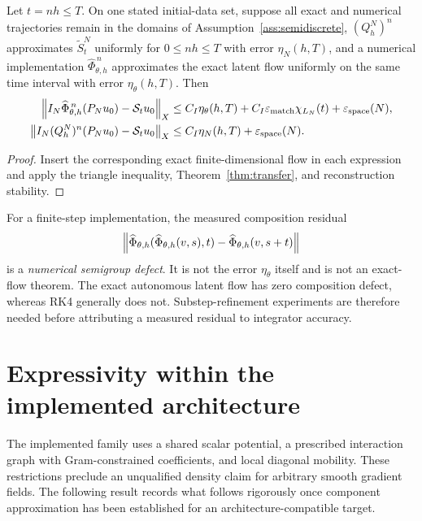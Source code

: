 \begin{proposition}\label{prop:numerical-transfer}
Let $t=nh\le T$. On one stated initial-data set, suppose all exact and numerical trajectories remain in the domains of Assumption~\ref{ass:semidiscrete}, $(Q_h^N)^n$ approximates $\widetilde S_t^N$ uniformly for $0\leq nh\leq T$ with error $\eta_N(h,T)$, and a numerical implementation $\widehat\Phi_{\theta,h}^{\,n}$ approximates the exact latent flow uniformly on the same time interval with error $\eta_\theta(h,T)$. Then
\begin{align}\label{eq:numerical-transfer}
\left\lVert I_N\widehat\Phi_{\theta,h}^{\,n}(P_Nu_0)-\mathcal{S}_tu_0 \right\rVert_X
&\le C_I\eta_\theta(h,T)
+C_I\varepsilon_{\mathrm{match}}\chi_{L_N}(t)
+\varepsilon_{\mathrm{space}}(N),\\
\left\lVert I_N(Q_h^N)^n(P_Nu_0)-\mathcal{S}_tu_0 \right\rVert_X
&\le C_I\eta_N(h,T)+\varepsilon_{\mathrm{space}}(N).
\end{align}
\end{proposition}

\begin{proof}
Insert the corresponding exact finite-dimensional flow in each expression and apply the triangle inequality, Theorem~\ref{thm:transfer}, and reconstruction stability.
\end{proof}

\begin{remark}\label{rem:numerical-semigroup-defect}
For a finite-step implementation, the measured composition residual
\begin{equation*}
\left\lVert \widehat\Phi_{\theta,h}(\widehat\Phi_{\theta,h}(v,s),t)
-\widehat\Phi_{\theta,h}(v,s+t) \right\rVert
\end{equation*}
is a \emph{numerical semigroup defect}. It is not the error $\eta_\theta$ itself and is not an exact-flow theorem. The exact autonomous latent flow has zero composition defect, whereas RK4 generally does not. Substep-refinement experiments are therefore needed before attributing a measured residual to integrator accuracy.
\end{remark}

\section{Expressivity within the implemented architecture}\label{sec:expressivity}

The implemented family uses a shared scalar potential, a prescribed interaction graph with Gram-constrained coefficients, and local diagonal mobility. These restrictions preclude an unqualified density claim for arbitrary smooth gradient fields. The following result records what follows rigorously once component approximation has been established for an architecture-compatible target.

